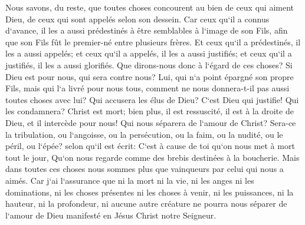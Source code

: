 \verse Nous savons, du reste, que toutes choses concourent au bien de ceux qui aiment Dieu, de ceux qui sont appelés selon son dessein. 
\verse Car ceux qu`il a connus d`avance, il les a aussi prédestinés à être semblables à l`image de son Fils, afin que son Fils fût le premier-né entre plusieurs frères. 
\verse Et ceux qu`il a prédestinés, il les a aussi appelés; et ceux qu`il a appelés, il les a aussi justifiés; et ceux qu`il a justifiés, il les a aussi glorifiés. 
\verse Que dirons-nous donc à l`égard de ces choses? Si Dieu est pour nous, qui sera contre nous? 
\verse Lui, qui n`a point épargné son propre Fils, mais qui l`a livré pour nous tous, comment ne nous donnera-t-il pas aussi toutes choses avec lui? 
\verse Qui accusera les élus de Dieu? C`est Dieu qui justifie! 
\verse Qui les condamnera? Christ est mort; bien plus, il est ressuscité, il est à la droite de Dieu, et il intercède pour nous! 
\verse Qui nous séparera de l`amour de Christ? Sera-ce la tribulation, ou l`angoisse, ou la persécution, ou la faim, ou la nudité, ou le péril, ou l`épée? 
\verse selon qu`il est écrit: C`est à cause de toi qu`on nous met à mort tout le jour, Qu`on nous regarde comme des brebis destinées à la boucherie. 
\verse Mais dans toutes ces choses nous sommes plus que vainqueurs par celui qui nous a aimés. 
\verse Car j`ai l`assurance que ni la mort ni la vie, ni les anges ni les dominations, ni les choses présentes ni les choses à venir, 
\verse ni les puissances, ni la hauteur, ni la profondeur, ni aucune autre créature ne pourra nous séparer de l`amour de Dieu manifesté en Jésus Christ notre Seigneur. 

